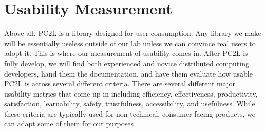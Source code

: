 \section{Usability Measurement}
Above all, PC2L is a library designed for user consumption. Any library we make will be essentially useless outside of our lab unless we can convince real users to adopt it. This is where our measurement of usability comes in. After PC2L is fully develop, we will find both experienced and novice distributed computing developers, hand them the documentation, and have them evaluate how usable PC2L is across several different criteria. There are several different major usability metrics that come up in \cite{usability} including efficiency, effectiveness, productivity, satisfaction, learnability, safety, trustfulness, accessibility, and usefulness. While these criteria are typically used for non-technical, consumer-facing products, we can adapt some of them for our purposes
